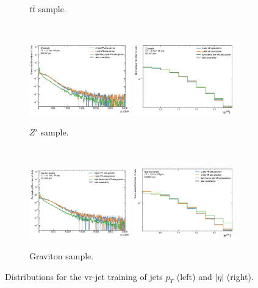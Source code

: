 \begin{figure}[h!]
\begin{subfigure}[b]{0.98\textwidth}
      \caption{$t\bar{t}$ sample.} 
      \label{apfig:vrjetdistt}
  \end{subfigure}\\
  \begin{subfigure}[b]{0.98\textwidth}
      \centering
      \includegraphics[width=0.48\textwidth]{Images/FTAG/VRDips/JetDist/zppt.png}
      \includegraphics[width=0.48\textwidth]{Images/FTAG/VRDips/JetDist/zpeta.png}
      \caption{$Z'$ sample.} 
      \label{apfig:vrjetdiszp}
  \end{subfigure}\\
  \begin{subfigure}[b]{0.98\textwidth}
      \centering
      \includegraphics[width=0.48\textwidth]{Images/FTAG/VRDips/JetDist/grpt.png}
      \includegraphics[width=0.48\textwidth]{Images/FTAG/VRDips/JetDist/greta.png}
      \caption{Graviton sample.} 
      \label{apfig:vrjetdisgr}
  \end{subfigure}
  \caption{Distributions for the \gls{vr}-jet training of jets $p_T$ (left) and $|\eta|$ (right).}
  \label{apfig:vrjetdist}
\end{figure} 

